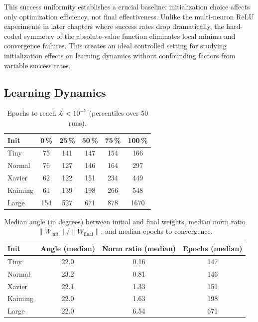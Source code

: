 This success uniformity establishes a crucial baseline: initialization choice affects only optimization efficiency, not final effectiveness. Unlike the multi-neuron ReLU experiments in later chapters where success rates drop dramatically, the hard-coded symmetry of the absolute-value function eliminates local minima and convergence failures. This creates an ideal controlled setting for studying initialization effects on learning dynamics without confounding factors from variable success rates.


\subsection*{Learning Dynamics}

\begin{table}[ht]
\centering
\caption{Epochs to reach $\mathcal L<10^{-7}$ (percentiles over 50 runs).}
\label{tab:abs1-init-epochs}
\begin{tabular}{lccccc}
\toprule
Init & 0\,\% & 25\,\% & 50\,\% & 75\,\% & 100\,\% \\
\midrule
Tiny    & 75  & 141 & 147 & 154 & 166 \\
Normal  & 76  & 127 & 146 & 164 & 297 \\
Xavier  & 62  & 122 & 151 & 234 & 449 \\
Kaiming & 61  & 139 & 198 & 266 & 548 \\
Large   & 154 & 527 & 671 & 878 & 1670 \\
\bottomrule
\end{tabular}
\end{table}

\begin{table}[ht]
\centering
\caption{Median angle (in degrees) between initial and final weights, median norm ratio $\lVert W_{\text{init}}\rVert / \lVert W_{\text{final}}\rVert$, and median epochs to convergence.}
\label{tab:abs1-init-angle-norm}
\begin{tabular}{lccc}
\toprule
Init & Angle (median) & Norm ratio (median) & Epochs (median) \\
\midrule
Tiny    & 22.0 & 0.16 & 147 \\
Normal  & 23.2 & 0.81 & 146 \\
Xavier  & 22.1 & 1.33 & 151 \\
Kaiming & 22.0 & 1.63 & 198 \\
Large   & 22.0 & 6.54 & 671 \\
\bottomrule
\end{tabular}
\end{table}


